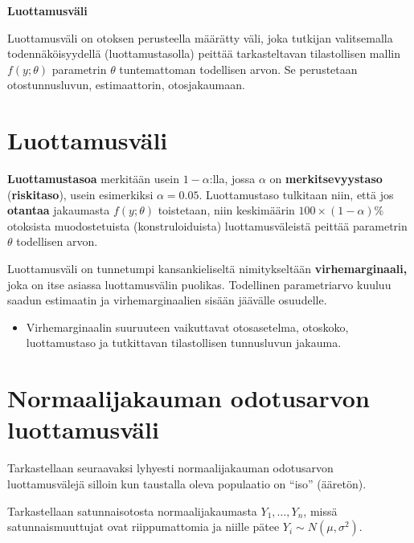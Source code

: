 \documentclass[
]{report}
\providecommand{\tightlist}{%
  \setlength{\itemsep}{0pt}\setlength{\parskip}{0pt}}\usepackage{longtable,booktabs,array}
\begin{document}
\begin{defblock}{}
\textbf{Luottamusväli}

Luottamusväli on otoksen perusteella määrätty väli, joka tutkijan
valitsemalla todennäköisyydellä (luottamustasolla) peittää
tarkasteltavan tilastollisen mallin \(f(y;\theta)\) parametrin
\(\theta\) tuntemattoman todellisen arvon. Se perustetaan
otostunnusluvun, estimaattorin, otosjakaumaan.

\end{defblock}

\hypertarget{luottamusvuxe4li}{%
\section{Luottamusväli}\label{luottamusvuxe4li}}

\textbf{Luottamustasoa} merkitään usein \(1-\alpha\):lla, jossa
\(\alpha\) on \textbf{merkitsevyystaso} (\textbf{riskitaso}), usein
esimerkiksi \(\alpha = 0.05\). Luottamustaso tulkitaan niin, että jos
\textbf{otantaa} jakaumasta \(f(y;\theta)\) toistetaan, niin keskimäärin
\(100 \times (1-\alpha)\%\) otoksista muodostetuista (konstruloiduista)
luottamusväleistä peittää parametrin \(\theta\) todellisen arvon.

Luottamusväli on tunnetumpi kansankieliseltä nimitykseltään
\textbf{virhemarginaali,} joka on itse asiassa luottamusvälin puolikas.
Todellinen parametriarvo kuuluu saadun estimaatin ja virhemarginaalien
sisään jäävälle osuudelle.

\begin{itemize}
\tightlist
\item
  Virhemarginaalin suuruuteen vaikuttavat otosasetelma, otoskoko,
  luottamustaso ja tutkittavan tilastollisen tunnusluvun jakauma.
\end{itemize}

\hypertarget{normaalijakauman-odotusarvon-luottamusvuxe4li}{%
\section{Normaalijakauman odotusarvon
luottamusväli}\label{normaalijakauman-odotusarvon-luottamusvuxe4li}}

Tarkastellaan seuraavaksi lyhyesti normaalijakauman odotusarvon
luottamusvälejä silloin kun taustalla oleva populaatio on ``iso''
(ääretön).

Tarkastellaan satunnaisotosta normaalijakaumasta \(Y_1,\dots,Y_n\),
missä satunnaismuuttujat ovat riippumattomia ja niille pätee
\(Y_i \sim N(\mu,\sigma^2)\).
\end{document}
